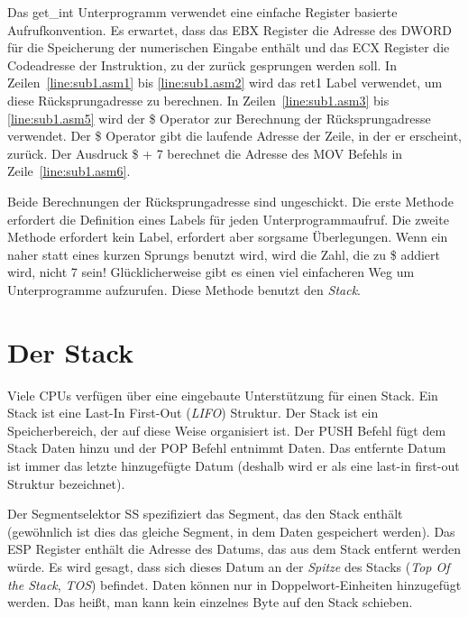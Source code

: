 Das {\code get\_int} Unterprogramm verwendet eine einfache Register
basierte Aufrufkonvention. Es erwartet, dass das EBX Register die
Adresse des DWORD f\"{u}r die Speicherung der numerischen Eingabe
enth\"{a}lt und das ECX Register die Codeadresse der Instruktion, zu der
zur\"{u}ck gesprungen werden soll. In Zeilen~\ref{line:sub1.asm1} bis
\ref{line:sub1.asm2} wird das {\code ret1} Label verwendet, um diese
R\"{u}cksprungadresse zu berechnen. In Zeilen~\ref{line:sub1.asm3} bis
\ref{line:sub1.asm5}  wird der {\code \$} Operator zur Berechnung
der R\"{u}cksprungadresse verwendet. Der {\code \$} Operator gibt die
laufende Adresse der Zeile, in der er erscheint, zur\"{u}ck. Der
Ausdruck {\code \$ + 7} berechnet die Adresse des {\code MOV}
Befehls in Zeile~\ref{line:sub1.asm6}.

Beide Berechnungen der R\"{u}cksprungadresse sind ungeschickt. Die erste
Methode erfordert die Definition eines Labels f\"{u}r jeden
Unterprogrammaufruf. Die zweite Methode erfordert kein Label,
erfordert aber sorgsame \"{U}berlegungen. Wenn ein naher statt eines
kurzen Sprungs benutzt wird, wird die Zahl, die zu {\code \$}
addiert wird, nicht 7 sein! Gl\"{u}cklicherweise gibt es einen viel
einfacheren Weg um Unterprogramme aufzurufen. Diese Methode benutzt
den \emph{Stack}.

\section{Der Stack}

Viele CPUs verf\"{u}gen \"{u}ber eine eingebaute Unterst\"{u}tzung f\"{u}r einen
Stack. Ein Stack ist eine Last-In First-Out (\emph{LIFO}) Struktur.
Der Stack ist ein Speicherbereich, der auf diese Weise organisiert
ist. Der {\code PUSH}  Befehl f\"{u}gt dem
Stack Daten hinzu und der {\code POP} 
Befehl entnimmt Daten. Das entfernte Datum ist immer das letzte
hinzugef\"{u}gte Datum (deshalb wird er als eine last-in first-out
Struktur bezeichnet).

Der Segmentselektor SS spezifiziert das Segment, das den Stack
enth\"{a}lt (gew\"{o}hnlich ist dies das gleiche Segment, in dem Daten
gespeichert werden). Das ESP Register enth\"{a}lt die Adresse des
Datums, das aus dem Stack entfernt werden w\"{u}rde. Es wird gesagt,
dass sich dieses Datum an der \emph{Spitze} des Stacks (\emph{Top Of
the Stack}, \emph{TOS})  befindet.
Daten k\"{o}nnen nur in Doppelwort-Einheiten hinzugef\"{u}gt werden. Das
hei{\ss}t, man kann kein einzelnes Byte auf den Stack schieben.

